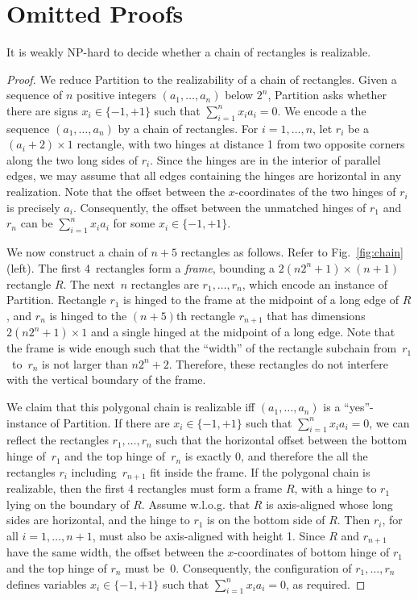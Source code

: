 \documentclass[runningheads]{article}
\begin{document}
\clearpage
\section{Omitted Proofs}
\label{app:omitted}

\setcounter{theorem}{0}
\begin{theorem}
It is weakly NP-hard to decide whether a chain of rectangles is realizable.
\end{theorem}
\begin{proof}
We reduce {\sc Partition} to the realizability of a chain of rectangles. Given a sequence of $n$ positive integers $(a_1,\ldots , a_n)$ below $2^n$, {\sc Partition} asks whether there are signs $x_i\in \{-1,+1\}$ such that $\sum_{i=1}^n x_ia_i=0$.
We encode a the sequence $(a_1,\ldots , a_n)$ by a chain of rectangles. For $i=1,\ldots, n$, let $r_i$ be a $(a_i+2)\times 1$ rectangle, with two hinges at distance 1 from two opposite corners along the two long sides of $r_i$. Since the hinges are in the interior of parallel edges, we may assume that all edges containing the hinges are horizontal in any realization. Note that the offset between the $x$-coordinates of the two hinges of $r_i$ is precisely $a_i$. Consequently, the offset between the unmatched hinges of $r_1$ and $r_n$ can be $\sum_{i=1}^n x_ia_i$ for some $x_i\in \{-1,+1\}$.

We now construct a chain of $n+5$ rectangles as follows. Refer to Fig.~\ref{fig:chain}(left). The first 4~rectangles form a \emph{frame}, bounding a $2(n2^n+1)\times (n+1)$ rectangle $R$. The next~$n$ rectangles are $r_1,\ldots , r_n$, which encode an instance of {\sc Partition}. Rectangle $r_1$ is hinged to the frame at the midpoint of a long edge of $R$, and $r_n$ is hinged to the $(n+5)$th rectangle $r_{n+1}$ that has dimensions $2(n2^n+1)\times 1$ and a single hinged at the midpoint of a long edge. Note that the frame is wide enough such that the ``width'' of the rectangle subchain from~$r_1$~to~$r_n$ is not larger than $n2^n+2$. Therefore, these rectangles do not interfere with the vertical boundary of the frame.

We claim that this polygonal chain is realizable iff $(a_1,\ldots , a_n)$ is a ``yes''-instance of {\sc Partition}. If there are $x_i\in \{-1,+1\}$ such that $\sum_{i=1}^n x_ia_i=0$, we can reflect the rectangles $r_1,\ldots ,r_n$ such that the horizontal offset between the bottom hinge of~$r_1$ and the top hinge of~$r_n$ is exactly 0, and therefore the all the rectangles $r_i$ including~$r_{n+1}$ fit inside the frame. If the polygonal chain is realizable, then the first 4 rectangles must form a frame $R$, with a hinge to $r_1$ lying on the boundary of $R$. Assume w.l.o.g. that $R$ is axis-aligned whose long sides are horizontal, and the hinge to $r_1$ is on the bottom side of $R$. Then $r_i$, for all $i=1,\ldots, n+1$, must also be axis-aligned with height 1. Since $R$ and $r_{n+1}$ have the same width, the offset between the $x$-coordinates of bottom hinge of $r_1$ and the top hinge of $r_n$ must be~0. Consequently, the configuration of $r_1,\ldots ,r_n$ defines variables $x_i\in \{-1,+1\}$ such that $\sum_{i=1}^n x_ia_i=0$, as required.
\end{proof}
\end{document}
